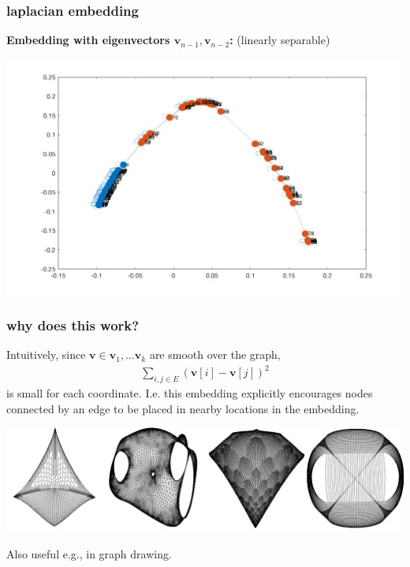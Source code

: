 \documentclass[compress]{beamer}
\newcommand{\bv}[1]{\mathbf{#1}}
\begin{document}
\begin{frame}
	\frametitle{laplacian embedding}
	\begin{center}
	\textbf{Embedding with eigenvectors $\bv{v}_{n-1}, \bv{v}_{n-2}$:} (linearly separable) 
			
			\includegraphics[width=.7\textwidth]{circ3.png}
	\end{center}
\end{frame}

\begin{frame}
	\frametitle{why does this work?}
	Intuitively, since $\bv{v} \in \bv{v}_1, \ldots \bv{v}_k$ are smooth over the graph, 
	\begin{align*}
		\sum_{i,j \in E} (\bv{v}[i] - \bv{v}[j])^2
	\end{align*}
	is small for each coordinate. I.e. this embedding explicitly encourages nodes connected by an edge to be placed in nearby locations in the embedding.
	\begin{center}
		\includegraphics[width=\textwidth]{graph_drawing.png}
		
		Also useful e.g., in graph drawing.
	\end{center}
	
\end{frame}
\end{document}
